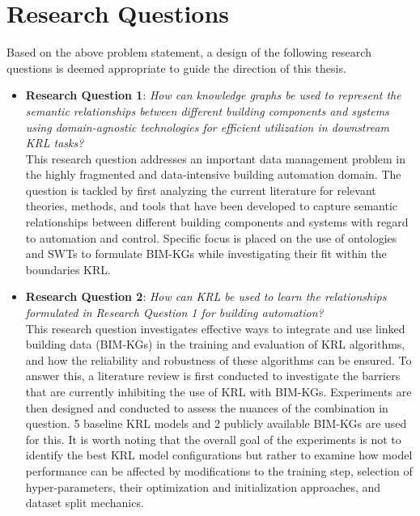 \section{Research Questions}
\label{sec:research questions}
Based on the above problem statement, a design of the following research questions is deemed appropriate to guide the direction of this thesis.
\begin{itemize}
    \item 
    \textbf{Research Question 1}: \textit{How can knowledge graphs be used to represent the semantic relationships between different building components and systems using domain-agnostic technologies for efficient utilization in downstream \ac{KRL} tasks?}\\

    This research question addresses an important data management problem in the highly fragmented and data-intensive building automation domain. The question is tackled by first analyzing the current literature for relevant theories, methods, and tools that have been developed to capture semantic relationships between different building components and systems with regard to automation and control. Specific focus is placed on the use of ontologies and \acp{SWT} to formulate \acp{BIM-KG} while investigating their fit within the boundaries \ac{KRL}.\\
    
    \item 
    \textbf{Research Question 2}: \textit{How can \ac{KRL} be used to learn the relationships formulated in Research Question 1 for building automation?} \\

    This research question investigates effective ways to integrate and use linked building data (\acp{BIM-KG}) in the training and evaluation of \ac{KRL} algorithms, and how the reliability and robustness of these algorithms can be ensured. To answer this, a literature review is first conducted to investigate the barriers that are currently inhibiting the use of \ac{KRL} with \acp{BIM-KG}. Experiments are then designed and conducted to assess the nuances of the combination in question. 5 baseline \ac{KRL} models and 2 publicly available \acp{BIM-KG} are used for this. It is worth noting that the overall goal of the experiments is not to identify the best \ac{KRL} model configurations but rather to examine how model performance can be affected by modifications to the training step, selection of hyper-parameters, their optimization and initialization approaches, and dataset split mechanics.


\end{itemize}
